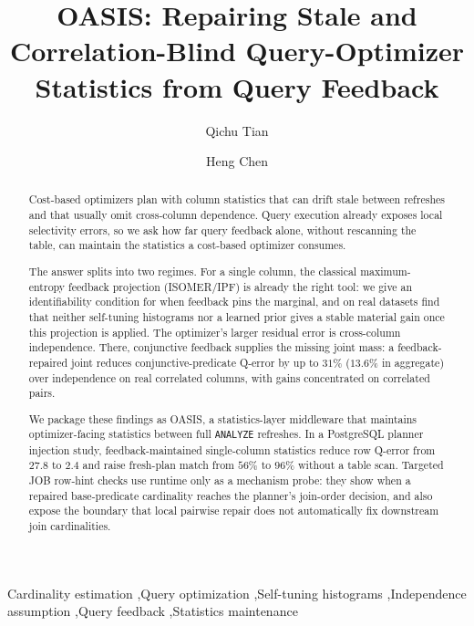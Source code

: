\documentclass[preprint,12pt]{elsarticle}
\begin{document}
\begin{frontmatter}

\title{OASIS: Repairing Stale and Correlation-Blind Query-Optimizer Statistics from Query Feedback}

\author[inst1]{Qichu Tian}

\author[inst1]{Heng Chen}

\address[inst1]{Xi'an Jiaotong University, Xi'an, China}

\begin{abstract}
Cost-based optimizers plan with column statistics that can drift stale between refreshes and
that usually omit cross-column dependence. Query execution already exposes local selectivity
errors, so we ask how far query feedback alone, without rescanning the table, can maintain the
statistics a cost-based optimizer consumes.

The answer splits into two regimes. For a single column, the classical maximum-entropy
feedback projection (ISOMER/IPF) is already the right tool: we give an identifiability
condition for when feedback pins the marginal, and on real datasets find that neither
self-tuning histograms nor a learned prior gives a stable material gain once this projection
is applied. The optimizer's larger residual error is cross-column independence. There,
conjunctive feedback supplies the missing joint mass: a feedback-repaired joint reduces
conjunctive-predicate Q-error by up to $31\%$ ($13.6\%$ in aggregate) over independence on real
correlated columns, with gains concentrated on correlated pairs.

We package these findings as OASIS, a statistics-layer middleware that maintains
optimizer-facing statistics between full \texttt{ANALYZE} refreshes. In a PostgreSQL planner
injection study, feedback-maintained single-column statistics reduce row Q-error from $27.8$
to $2.4$ and raise fresh-plan match from $56\%$ to $96\%$ without a table scan. Targeted JOB
row-hint checks use runtime only as a mechanism probe: they show when a repaired
base-predicate cardinality reaches the planner's join-order decision, and also expose the
boundary that local pairwise repair does not automatically fix downstream join cardinalities.
\end{abstract}

\begin{keyword}
Cardinality estimation \sep Query optimization \sep Self-tuning histograms
\sep Independence assumption \sep Query feedback \sep Statistics maintenance
\end{keyword}

\end{frontmatter}
\end{document}
